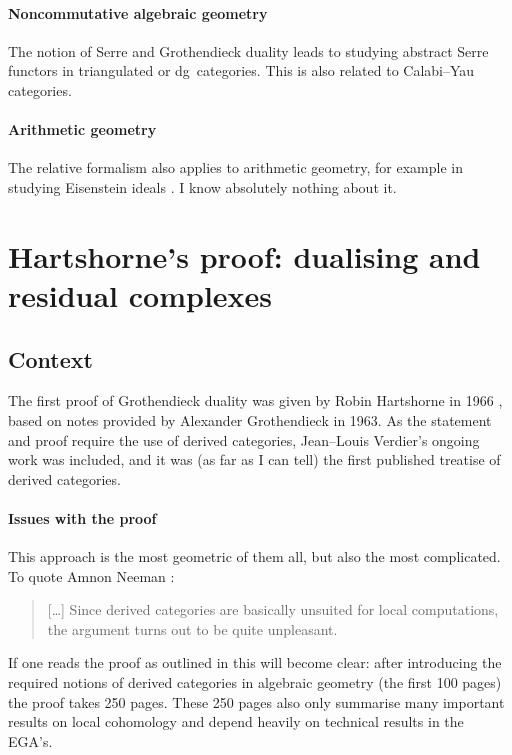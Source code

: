 \documentclass[10pt,a4paper]{article}
\begin{document}
\paragraph{Noncommutative algebraic geometry}
The notion of Serre and Grothendieck duality leads to studying abstract Serre functors in triangulated or dg~categories. This is also related to Calabi--Yau categories.

\paragraph{Arithmetic geometry}
The relative formalism also applies to arithmetic geometry, for example in studying Eisenstein ideals \cite{mazur-modular-curves-eisenstein-ideal}. I know absolutely nothing about it.


\section{Hartshorne's proof: dualising and residual complexes}
\label{section:hartshorne}
\subsection{Context}
\label{subsection:context}
The first proof of Grothendieck duality was given by Robin Hartshorne in 1966 \cite{hartshorne-residues-and-duality}, based on notes provided by Alexander Grothendieck in 1963. As the statement and proof require the use of derived categories, Jean--Louis Verdier's ongoing work was included, and it was (as far as I can tell) the first published treatise of derived categories.

\paragraph{Issues with the proof}
This approach is the most geometric of them all, but also the most complicated. To quote Amnon Neeman \cite{neeman-grothendieck-duality-bousfield-brown}:
\begin{quote}
  [\ldots] Since derived categories are basically unsuited for local computations, the argument turns out to be quite unpleasant.
\end{quote}
If one reads the proof as outlined in \cite{hartshorne-residues-and-duality} this will become clear: after introducing the required notions of derived categories in algebraic geometry (the first 100 pages) the proof takes 250 pages. These 250 pages also only summarise many important results on local cohomology and depend heavily on technical results in the EGA's.
\end{document}
